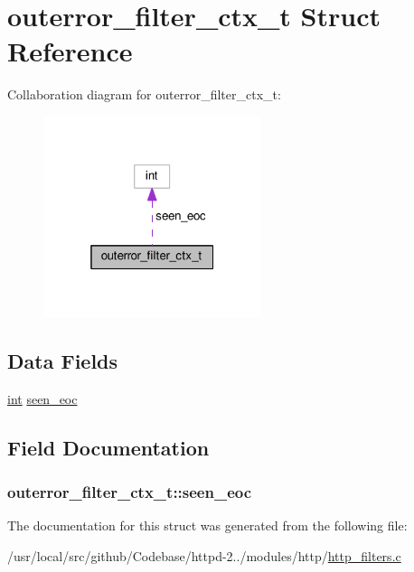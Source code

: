 \hypertarget{structouterror__filter__ctx__t}{}\section{outerror\+\_\+filter\+\_\+ctx\+\_\+t Struct Reference}
\label{structouterror__filter__ctx__t}


Collaboration diagram for outerror\+\_\+filter\+\_\+ctx\+\_\+t\+:
\nopagebreak
\begin{figure}[H]
\begin{center}
\leavevmode
\includegraphics[width=181pt]{structouterror__filter__ctx__t__coll__graph}
\end{center}
\end{figure}
\subsection*{Data Fields}
\begin{DoxyCompactItemize}
\item 
\hyperlink{pcre_8txt_a42dfa4ff673c82d8efe7144098fbc198}{int} \hyperlink{structouterror__filter__ctx__t_a8535206a76c9a7e7377d96d1e03f86f6}{seen\+\_\+eoc}
\end{DoxyCompactItemize}


\subsection{Field Documentation}
\subsubsection[{\texorpdfstring{seen\+\_\+eoc}{seen_eoc}}]{ outerror\+\_\+filter\+\_\+ctx\+\_\+t\+::seen\+\_\+eoc}\hypertarget{structouterror__filter__ctx__t_a8535206a76c9a7e7377d96d1e03f86f6}{}\label{structouterror__filter__ctx__t_a8535206a76c9a7e7377d96d1e03f86f6}


The documentation for this struct was generated from the following file\+:\begin{DoxyCompactItemize}
\item 
/usr/local/src/github/\+Codebase/httpd-\/2../modules/http/\hyperlink{http__filters_8c}{http\+\_\+filters.\+c}\end{DoxyCompactItemize}
